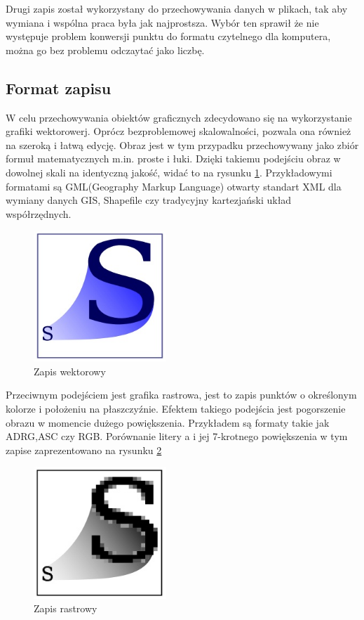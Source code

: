 Drugi zapis został wykorzystany do przechowywania danych w plikach, tak aby wymiana i wspólna praca była jak najprostsza. Wybór ten sprawił że nie występuje problem konwersji punktu do formatu czytelnego dla komputera, można go bez problemu odczaytać jako liczbę.

\subsection{Format zapisu}
\label{subsec:zapisWektorowy}

W celu przechowywania obiektów graficznych zdecydowano się na wykorzystanie grafiki wektorowerj. Oprócz bezproblemowej skalowalności, pozwala ona również na szeroką i łatwą edycję.
Obraz jest w tym przypadku przechowywany jako zbiór formuł matematycznych m.in. proste i łuki. Dzięki takiemu podejściu obraz w dowolnej skali na identyczną jakość, widać to na rysunku \ref{fig:wekt}. Przykładowymi formatami są GML(Geography Markup Language) otwarty standart XML dla wymiany danych GIS, Shapefile czy tradycyjny kartezjański układ współrzędnych.

  \begin{figure}[H]
  \centering
    \includegraphics[width=50mm]{ge/a1.jpg}
  \caption{Zapis wektorowy}
  \label{fig:wekt}
  \end{figure}

Przeciwnym podejściem jest grafika rastrowa, jest to zapis punktów o określonym kolorze i położeniu na płaszczyźnie.  Efektem takiego podejścia jest pogorszenie obrazu w momencie dużego powiększenia. Przykładem są formaty takie jak ADRG,ASC czy RGB.
Porównanie litery a i jej 7-krotnego powiększenia w tym zapise zaprezentowano na rysunku \ref{fig:rast}
  \begin{figure}[H]
  \centering
    \includegraphics[width=50mm]{ge/a2.jpg}
  \caption{Zapis rastrowy}
  \label{fig:rast}
  \end{figure}

